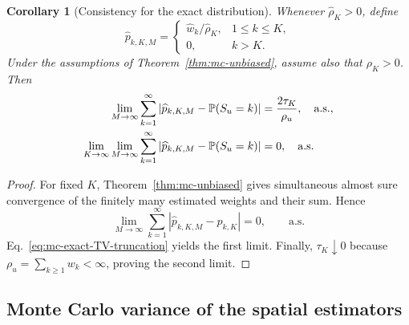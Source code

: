 \documentclass[aap,preprint]{imsart}
\theoremstyle{plain}
\newtheorem{corollary}[theorem]{Corollary}
\theoremstyle{definition}
\def\P{{\mathbb P}}
\begin{document}
\begin{corollary}[Consistency for the exact distribution]
	\label{cor:mc-two-stage-consistency}
	Whenever $\widehat\rho_K>0$, define
	\[
	\widehat p_{k,K,M}
	=
	\begin{cases}
		\widehat w_k/\widehat\rho_K,&1\leq k\leq K,\\
		0,&k>K.
	\end{cases}
	\]
	Under the assumptions of Theorem~\ref{thm:mc-unbiased}, assume also that
	$\rho_K>0$.  Then
	\begin{equation*}
		\begin{split}
		\lim_{M\to\infty}\sum_{k=1}^{\infty} \left|
		\widehat p_{k,K,M}
		-\P(S_u=k)
		\right|
		&=\frac{2\tau_K}{\rho_u}, \quad \text{\rm a.s.},\\
		\lim_{K\to\infty}\lim_{M\to\infty}
		\sum_{k=1}^{\infty} \left|
		\widehat p_{k,K,M}
		-\P(S_u=k)
		\right|&=0, \quad \text{\rm a.s.}
		\end{split}
	\end{equation*}
\end{corollary}

\begin{proof}
	For fixed $K$, Theorem~\ref{thm:mc-unbiased} gives simultaneous
	almost sure convergence of the finitely many estimated weights and their
	sum.  Hence 
	\[
	\lim_{M\to\infty}\sum_{k=1}^{\infty} \left|
	\widehat p_{k,K,M}
	- p_{k,K}
	\right| =0, \qquad \text{a.s.}
	\]
	Eq.~\eqref{eq:mc-exact-TV-truncation} yields the first limit.
	Finally, $\tau_K\downarrow0$ because
	$\rho_u=\sum_{k\geq1}w_k<\infty$, proving the second limit.
\end{proof}

\subsection{Monte Carlo variance of the spatial estimators}
\label{sec:mc-spatial-variance}
\end{document}
